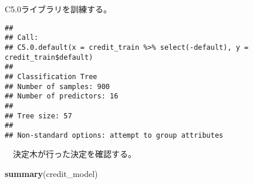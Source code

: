 \documentclass[
]{article}
\newenvironment{Shaded}{\begin{snugshade}}{\end{snugshade}}
\newcommand{\FunctionTok}[1]{\textcolor[rgb]{0.13,0.29,0.53}{\textbf{#1}}}
\newcommand{\NormalTok}[1]{#1}
\newcommand{\OtherTok}[1]{\textcolor[rgb]{0.56,0.35,0.01}{#1}}
\newcommand{\SpecialCharTok}[1]{\textcolor[rgb]{0.81,0.36,0.00}{\textbf{#1}}}
\begin{document}
C5.0ライブラリを訓練する。

\begin{Shaded}
\end{Shaded}

\begin{verbatim}
## 
## Call:
## C5.0.default(x = credit_train %>% select(-default), y = credit_train$default)
## 
## Classification Tree
## Number of samples: 900 
## Number of predictors: 16 
## 
## Tree size: 57 
## 
## Non-standard options: attempt to group attributes
\end{verbatim}

　決定木が行った決定を確認する。

\begin{Shaded}
\begin{Highlighting}[]
\FunctionTok{summary}\NormalTok{(credit\_model)}
\end{Highlighting}
\end{Shaded}
\end{document}
